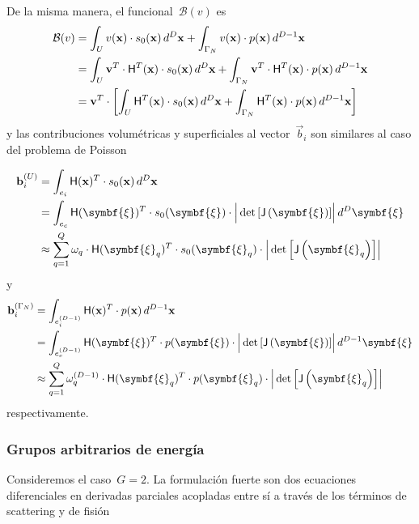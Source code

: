 \documentclass[
  12pt,
  a4paper,
  table]{scrbook}
\theoremstyle{plain}
\theoremstyle{definition}
\theoremstyle{plain}
\theoremstyle{plain}
\theoremstyle{remark}
\begin{document}
De la misma manera, el funcional~\(\mathcal{B}(v)\) es \[
\begin{aligned}
\mathcal{B}(v) &= \int_U v(\mathbf{x}) \cdot s_0(\mathbf{x}) \, d^D \mathbf{x} + \int_{\Gamma_N} v(\mathbf{x}) \cdot p(\mathbf{x}) \, d^{D-1} \mathbf{x} \\
&= \int_U \mathbf{v}^T \cdot \mathsf{H}^T(\mathbf{x}) \cdot s_0(\mathbf{x}) \, d^D \mathbf{x}
+ \int_{\Gamma_N} \mathbf{v}^T \cdot \mathsf{H}^T(\mathbf{x}) \cdot p(\mathbf{x}) \, d^{D-1} \mathbf{x} \\
&= \mathbf{v}^T \cdot \left[ \int_{U} \mathsf{H}^T(\mathbf{x}) \cdot s_0(\mathbf{x}) \, d^D \mathbf{x}
+ \int_{\Gamma_N} \mathsf{H}^T(\mathbf{x}) \cdot p(\mathbf{x}) \, d^{D-1}\mathbf{x} \right]
\end{aligned}
\] y las contribuciones volumétricas y superficiales al
vector~\(\vec{b}_i\) son similares al caso del problema de Poisson

\[
\begin{aligned}
\vec{b}_i^{(U)} &= \int_{e_i} \mat{H}(\vec{x})^T \cdot s_0(\vec{x}) \, d^D\vec{x} \\
&= \int_{e_c} \mat{H}(\symbf{\xi})^T \cdot s_0(\symbf{\xi}) \cdot \Big|\det{\left[\mat{J}\left(\symbf{\xi}\right)\right]}\Big| \, d^D\symbf{\xi} \\
&\approx
\sum_{q=1}^Q \omega_q \cdot \mat{H}(\symbf{\xi}_q)^T \cdot s_0(\symbf{\xi}_q) \cdot \Big|\det{\left[\mat{J}\left(\symbf{\xi}_q\right)\right]}\Big| 
\end{aligned}
\] y \[
\begin{aligned}
\vec{b}_i^{(\Gamma_N)} &= \int_{e_i^{(D-1)}} \mat{H}(\vec{x})^T \cdot p(\vec{x}) \, d^{D-1}\vec{x} \\
&= \int_{e_c^{(D-1)}} \mat{H}(\symbf{\xi})^T \cdot p(\symbf{\xi}) \cdot \Big|\det{\left[\mat{J}\left(\symbf{\xi}\right)\right]}\Big| \, d^{D-1}\symbf{\xi} \\
&\approx
\sum_{q=1}^Q \omega_q^{(D-1)} \cdot \mat{H}(\symbf{\xi}_q)^T \cdot p(\symbf{\xi}_q) \cdot \Big|\det{\left[\mat{J}\left(\symbf{\xi}_q\right)\right]}\Big| 
\end{aligned}
\] respectivamente.

\hypertarget{grupos-arbitrarios-de-energuxeda}{%
\subsubsection{Grupos arbitrarios de
energía}\label{grupos-arbitrarios-de-energuxeda}}

Consideremos el caso~\(G=2\). La formulación fuerte son dos ecuaciones
diferenciales en derivadas parciales acopladas entre sí a través de los
términos de \foreignlanguage{american}{scattering} y de fisión
\end{document}
